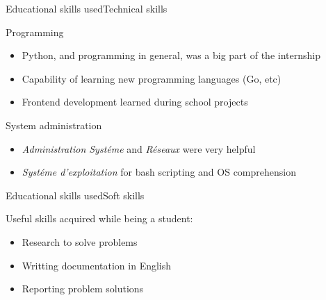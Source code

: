 \documentclass[10pt]{beamer}
\begin{document}
\begin{frame}{Educational skills used}{Technical skills}

\begin{block}{Programming}
  \begin{itemize}
    \item Python, and programming in general, was a big part of the internship
    \item Capability of learning new programming languages (Go, etc)
    \item Frontend development learned during school projects
  \end{itemize}
\end{block}
\begin{block}{System administration}
  \begin{itemize}
    \item \textit{Administration Systéme} and \textit{Réseaux} were very helpful
    \item \textit{Systéme d'exploitation} for bash scripting and OS comprehension
  \end{itemize}
\end{block}
\end{frame}
\begin{frame}{Educational skills used}{Soft skills}

\begin{block}{Useful skills acquired while being a student:}
  \begin{itemize}
    \item Research to solve problems
    \item Writting documentation in English
    \item Reporting problem solutions
  \end{itemize}

\end{block}
\end{frame}
\end{document}
